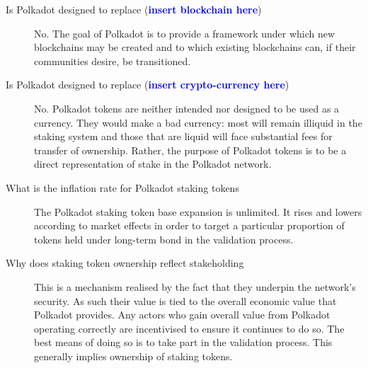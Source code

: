 \documentclass[t,usepdftitle=false]{beamer}
\renewcommand{\textit}[1]{\textcolor{blue}{\textbf{#1}}}
\begin{document}
\begin{frame}
\begin{description}

\item[Is Polkadot designed to replace (\textit{insert blockchain here})] No. The goal of Polkadot is to provide a framework under which new blockchains may be created and to which existing blockchains can, if their communities desire, be transitioned.

\item[Is Polkadot designed to replace (\textit{insert crypto-currency here})] No. Polkadot tokens are neither intended nor designed to be used as a currency. They would make a bad currency: most will remain illiquid in the staking system and those that are liquid will face substantial fees for transfer of ownership. Rather, the purpose of Polkadot tokens is to be a direct representation of stake in the Polkadot network.

\item[What is the inflation rate for Polkadot staking tokens] The Polkadot staking token base expansion is unlimited. It rises and lowers according to market effects in order to target a particular proportion of tokens held under long-term bond in the validation process.

\item[Why does staking token ownership reflect stakeholding] This is a mechanism realised by the fact that they underpin the network's security. As such their value is tied to the overall economic value that Polkadot provides. Any actors who gain overall value from Polkadot operating correctly are incentivised to ensure it continues to do so. The best means of doing so is to take part in the validation process. This generally implies ownership of staking tokens.

\end{description}

\end{frame}
\end{document}
